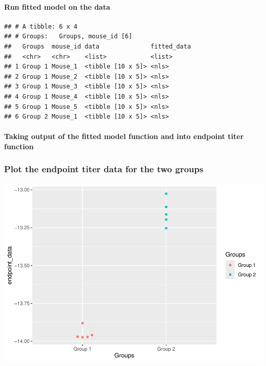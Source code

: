 \documentclass[
]{book}
\begin{document}
\hypertarget{run-fitted-model-on-the-data}{%
\paragraph{Run fitted model on the data}\label{run-fitted-model-on-the-data}}

\begin{verbatim}
## # A tibble: 6 x 4
## # Groups:   Groups, mouse_id [6]
##   Groups  mouse_id data              fitted_data
##   <chr>   <chr>    <list>            <list>     
## 1 Group 1 Mouse_1  <tibble [10 x 5]> <nls>      
## 2 Group 1 Mouse_2  <tibble [10 x 5]> <nls>      
## 3 Group 1 Mouse_3  <tibble [10 x 5]> <nls>      
## 4 Group 1 Mouse_4  <tibble [10 x 5]> <nls>      
## 5 Group 1 Mouse_5  <tibble [10 x 5]> <nls>      
## 6 Group 2 Mouse_1  <tibble [10 x 5]> <nls>
\end{verbatim}

\hypertarget{taking-output-of-the-fitted-model-function-and-into-endpoint-titer-function}{%
\paragraph{Taking output of the fitted model function and into endpoint titer function}\label{taking-output-of-the-fitted-model-function-and-into-endpoint-titer-function}}

\hypertarget{plot-the-endpoint-titer-data-for-the-two-groups}{%
\subsubsection{Plot the endpoint titer data for the two groups}\label{plot-the-endpoint-titer-data-for-the-two-groups}}

\includegraphics{csu-impactb_files/figure-latex/unnamed-chunk-58-1.pdf}
\end{document}
